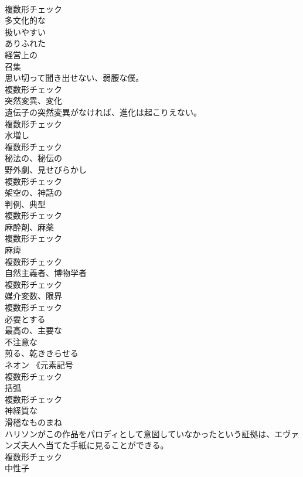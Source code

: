 \documentclass[8pt]{extreport}
\begin{document}
\begin{CJK}{UTF8}{min}
\\	複数形チェック
\\	[形容詞]	多文化的な	
\\	[形容詞]	扱いやすい	
\\	[形容詞]	ありふれた	
\\	[形容詞]	経営上の	
\\	[名詞]	召集	
\\	思い切って聞き出せない、弱腰な僕。	
\\	複数形チェック
\\	[名詞]	突然変異、変化	
\\	遺伝子の突然変異がなければ、進化は起こりえない。	
\\	複数形チェック
\\	[名詞]	水増し	
\\	複数形チェック
\\	[形容詞]	秘法の、秘伝の	
\\	[名詞]	野外劇、見せびらかし	
\\	複数形チェック
\\	[形容詞]	架空の、神話の	
\\	[名詞]	判例、典型	
\\	複数形チェック
\\	[名詞]	麻酔剤、麻薬	
\\	複数形チェック
\\	[名詞]	麻痺	
\\	複数形チェック
\\	[名詞]	自然主義者、博物学者	
\\	複数形チェック
\\	[名詞]	媒介変数、限界	
\\	複数形チェック
\\	[動詞]	必要とする	
\\	[形容詞]	最高の、主要な	
\\	[形容詞]	不注意な	
\\	[動詞]	煎る、乾ききらせる	
\\	[名詞]	ネオン 《元素記号 
\\	複数形チェック
\\	[名詞]	括弧	
\\	複数形チェック
\\	[形容詞]	神経質な	
\\	[名詞]	滑稽なものまね	
\\	ハリソンがこの作品をパロディとして意図していなかったという証拠は、エヴァンズ夫人へ当てた手紙に見ることができる。	
\\	複数形チェック
\\	[名詞]	中性子	

\end{CJK}
\end{document}
